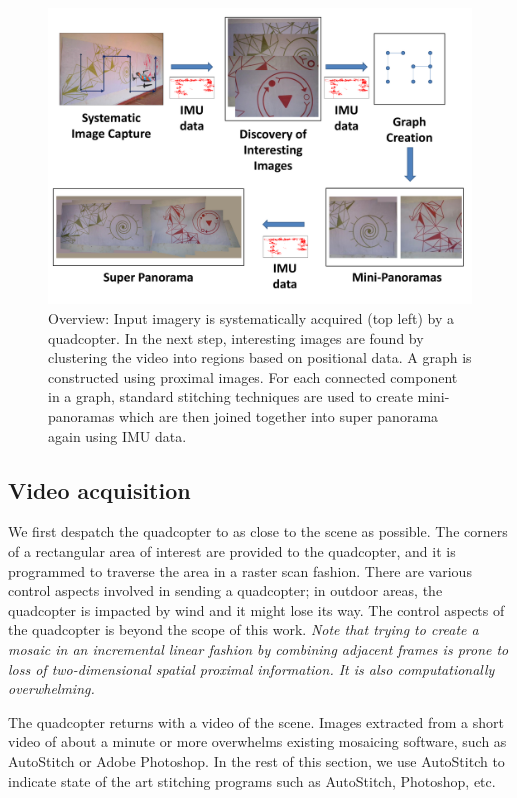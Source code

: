\begin{figure}[h!]
  \centering
  \includegraphics[width=\textwidth]{figures/Workflow} 
  \caption[Workflow]{ \label{fig:workflow} Overview: Input imagery is
    systematically acquired (top left) by a quadcopter.  In the next
    step, interesting images are found by clustering the video into
    regions based on positional data.  A graph is constructed using
    proximal images. For each connected component in a graph, standard
    stitching techniques are used to create mini-panoramas which are
    then joined together into super panorama 
    again using IMU data.}
\end{figure}    


\subsection{Video acquisition}
We first despatch the quadcopter to as close to the scene as
possible. The corners of a rectangular area of interest are provided
to the quadcopter, and it is programmed to traverse the area in a
raster scan fashion.  There are various control aspects involved in
sending a quadcopter; in outdoor areas, the quadcopter is impacted by
wind and it might lose its way.  The control aspects of the quadcopter
is beyond the scope of this work.  \emph{Note that trying to create a
  mosaic in an incremental linear fashion by combining adjacent frames is
  prone to loss of two-dimensional spatial proximal information. It is also
  computationally overwhelming.}

The quadcopter returns with a video of the scene.  Images extracted
from a short video of about a minute or more overwhelms existing
mosaicing software, such as AutoStitch or Adobe Photoshop.  In the
rest of this section, we use AutoStitch to indicate state of the art
stitching programs such as AutoStitch, Photoshop, etc.

